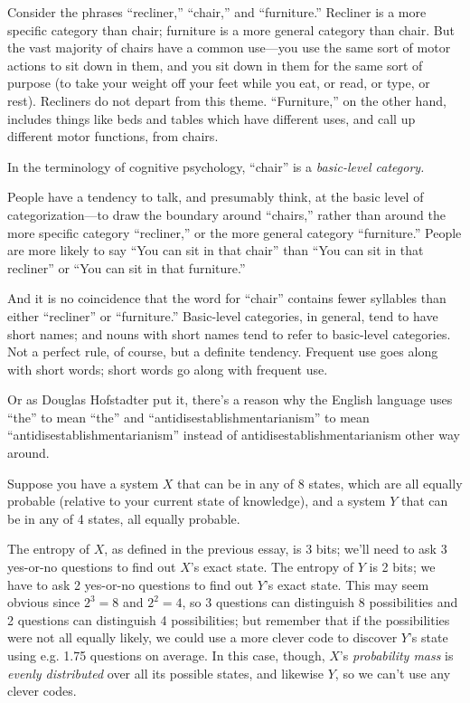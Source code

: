 {{{
 Consider the phrases
``recliner,''
``chair,'' and
``furniture.'' Recliner is a more
specific category than chair; furniture is a more general category than
chair. But the vast majority of chairs have a common use---you use the
same sort of motor actions to sit down in them, and you sit down in
them for the same sort of purpose (to take your weight off your feet
while you eat, or read, or type, or rest). Recliners do not depart from
this theme. ``Furniture,'' on the
other hand, includes things like beds and tables which have different
uses, and call up different motor functions, from chairs.}

{
 In the terminology of cognitive psychology,
``chair'' is a \textit{basic-level
category.}}

{
 People have a tendency to talk, and presumably think, at the basic
level of categorization---to draw the boundary around
``chairs,'' rather than around the
more specific category ``recliner,''
or the more general category
``furniture.'' People are more
likely to say ``You can sit in that
chair'' than ``You can sit in that
recliner'' or ``You can sit in that
furniture.''}

{
 And it is no coincidence that the word for
``chair'' contains fewer syllables
than either ``recliner'' or
``furniture.'' Basic-level
categories, in general, tend to have short names; and nouns with short
names tend to refer to basic-level categories. Not a perfect rule, of
course, but a definite tendency. Frequent use goes along with short
words; short words go along with frequent use.}

{
 Or as Douglas Hofstadter put it, there's a reason
why the English language uses
``the'' to mean
``the'' and
``antidisestablishmentarianism'' to
mean
``antidisestablishmentarianism''
instead of antidisestablishmentarianism other way around.}

\myendsectiontext


{
 Suppose you have a system $X$ that can be in any of 8 states, which
are all equally probable (relative to your current state of knowledge),
and a system $Y$ that can be in any of 4 states, all equally probable. }

{
 The entropy of $X$, as defined in the previous essay, is 3 bits;
we'll need to ask 3 yes-or-no questions to find out
$X$'s exact state. The entropy of $Y$ is 2 bits; we have to
ask 2 yes-or-no questions to find out $Y$'s exact state.
This may seem obvious since $2^3 = 8$ and
$2^2 = 4$, so 3 questions can distinguish 8
possibilities and 2 questions can distinguish 4 possibilities; but
remember that if the possibilities were not all equally likely, we
could use a more clever code to discover $Y$'s state
using e.g. 1.75 questions on average. In this case, though,
$X$'s \textit{probability mass} is \textit{evenly
distributed} over all its possible states, and likewise $Y$, so we
can't use any clever codes.}

}}
